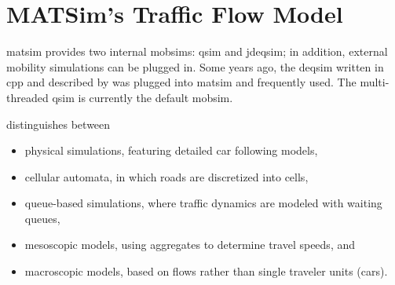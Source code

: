 \section{MATSim's Traffic Flow Model}
\label{sec:trafficflowmodel}
\gls{matsim} provides two internal \glspl{mobsim}: \gls{qsim} and \gls{jdeqsim}; in addition, external mobility simulations can be plugged in. Some years ago, the \gls{deqsim} written in \gls{cpp} and described by \citet[][]{Charypar_PhDThesis_2008,%
CharyparAxhausenEtAl2007Event-DrivenQueueBasedTraffic,%
CharyparAxhausenEtAl2007event-drivenparallelqueue-based,%
CharyparEtAl_TRB_2009}
was plugged into \gls{matsim} and frequently used. The multi-threaded \gls{qsim} is currently the default \gls{mobsim}.

\citet[][]{CharyparEtAl_TRB_2009} distinguishes between 
\begin{itemize}\styleItemize
\item physical simulations, featuring detailed car following models, %
\item cellular automata, in which roads are discretized into cells,
\item queue-based simulations, where traffic dynamics are modeled with waiting queues,
\item mesoscopic models, using aggregates to determine travel speeds, and
\item macroscopic models, based on flows rather than single traveler units (\eg cars).
\end{itemize}

